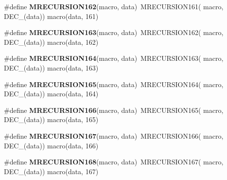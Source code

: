 \begin{DoxyCompactItemize}
\item 
\hypertarget{group__group__sam0__utils__mrecursion_ga6c3b057c06e8d93ffdf5c7fdb105ede2}{}\#define {\bfseries M\+R\+E\+C\+U\+R\+S\+I\+O\+N162}(macro,  data)~M\+R\+E\+C\+U\+R\+S\+I\+O\+N161(  macro, D\+E\+C\+\_\+(data))   macro(data, 161)\label{group__group__sam0__utils__mrecursion_ga6c3b057c06e8d93ffdf5c7fdb105ede2}

\item 
\hypertarget{group__group__sam0__utils__mrecursion_ga9afa4ec669818640ed94de0404f0e982}{}\#define {\bfseries M\+R\+E\+C\+U\+R\+S\+I\+O\+N163}(macro,  data)~M\+R\+E\+C\+U\+R\+S\+I\+O\+N162(  macro, D\+E\+C\+\_\+(data))   macro(data, 162)\label{group__group__sam0__utils__mrecursion_ga9afa4ec669818640ed94de0404f0e982}

\item 
\hypertarget{group__group__sam0__utils__mrecursion_gaca0807249e00f403e7a8af24aae6e921}{}\#define {\bfseries M\+R\+E\+C\+U\+R\+S\+I\+O\+N164}(macro,  data)~M\+R\+E\+C\+U\+R\+S\+I\+O\+N163(  macro, D\+E\+C\+\_\+(data))   macro(data, 163)\label{group__group__sam0__utils__mrecursion_gaca0807249e00f403e7a8af24aae6e921}

\item 
\hypertarget{group__group__sam0__utils__mrecursion_ga66969ef41cc8bef39c450f9b204a99ce}{}\#define {\bfseries M\+R\+E\+C\+U\+R\+S\+I\+O\+N165}(macro,  data)~M\+R\+E\+C\+U\+R\+S\+I\+O\+N164(  macro, D\+E\+C\+\_\+(data))   macro(data, 164)\label{group__group__sam0__utils__mrecursion_ga66969ef41cc8bef39c450f9b204a99ce}

\item 
\hypertarget{group__group__sam0__utils__mrecursion_ga15ec150303a94ea66c95c878e13013c7}{}\#define {\bfseries M\+R\+E\+C\+U\+R\+S\+I\+O\+N166}(macro,  data)~M\+R\+E\+C\+U\+R\+S\+I\+O\+N165(  macro, D\+E\+C\+\_\+(data))   macro(data, 165)\label{group__group__sam0__utils__mrecursion_ga15ec150303a94ea66c95c878e13013c7}

\item 
\hypertarget{group__group__sam0__utils__mrecursion_ga82ff65a44b710e5d91c341035b18775c}{}\#define {\bfseries M\+R\+E\+C\+U\+R\+S\+I\+O\+N167}(macro,  data)~M\+R\+E\+C\+U\+R\+S\+I\+O\+N166(  macro, D\+E\+C\+\_\+(data))   macro(data, 166)\label{group__group__sam0__utils__mrecursion_ga82ff65a44b710e5d91c341035b18775c}

\item 
\hypertarget{group__group__sam0__utils__mrecursion_gadaf1ee758a9df8e9fc64e904b34ba008}{}\#define {\bfseries M\+R\+E\+C\+U\+R\+S\+I\+O\+N168}(macro,  data)~M\+R\+E\+C\+U\+R\+S\+I\+O\+N167(  macro, D\+E\+C\+\_\+(data))   macro(data, 167)\label{group__group__sam0__utils__mrecursion_gadaf1ee758a9df8e9fc64e904b34ba008}


\end{DoxyCompactItemize}
